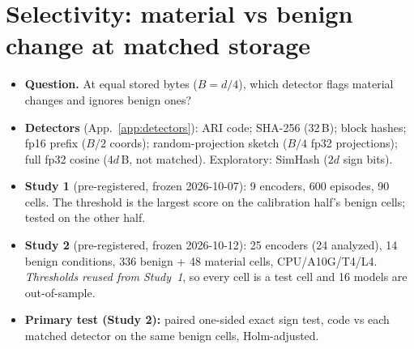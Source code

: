 \documentclass{article}
\begin{document}
\section{Selectivity: material vs benign change at matched storage}\label{sec:select}
\begin{itemize}
  \item \textbf{Question.} At equal stored bytes ($B=d/4$), which detector flags material changes and ignores benign ones?
  \item \textbf{Detectors} (App.~\ref{app:detectors}): ARI code; SHA-256 (32\,B); block hashes; fp16 prefix ($B/2$ coords); random-projection sketch ($B/4$ fp32 projections); full fp32 cosine ($4d$\,B, not matched). Exploratory: SimHash ($2d$ sign bits).
  \item \textbf{Study 1} (pre-registered, frozen 2026-10-07): 9 encoders, 600 episodes, 90 cells. The threshold is the largest score on the calibration half's benign cells; tested on the other half.
  \item \textbf{Study 2} (pre-registered, frozen 2026-10-12): 25 encoders (24 analyzed), 14 benign conditions, 336 benign + 48 material cells, CPU/A10G/T4/L4. \emph{Thresholds reused from Study~1}, so every cell is a test cell and 16 models are out-of-sample.
  \item \textbf{Primary test (Study 2):} paired one-sided exact sign test, code vs each matched detector on the same benign cells, Holm-adjusted.
\end{itemize}
\end{document}
